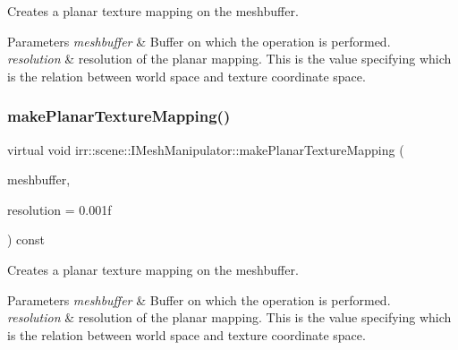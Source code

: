Creates a planar texture mapping on the meshbuffer. 


\begin{DoxyParams}{Parameters}
{\em meshbuffer} & Buffer on which the operation is performed. \\
\hline
{\em resolution} & resolution of the planar mapping. This is the value specifying which is the relation between world space and texture coordinate space. \\
\hline
\end{DoxyParams}
\mbox{\label{classirr_1_1scene_1_1IMeshManipulator_a757511833420a24ed8cbf4dfd6607143}} 
\subsubsection{\texorpdfstring{make\+Planar\+Texture\+Mapping()}{makePlanarTextureMapping()}\hspace{0.1cm}{\footnotesize\ttfamily [4/8]}}
{\footnotesize\ttfamily virtual void irr\+::scene\+::\+I\+Mesh\+Manipulator\+::make\+Planar\+Texture\+Mapping (\begin{DoxyParamCaption}\item[{\hyperlink{classirr_1_1scene_1_1IMeshBuffer}{scene\+::\+I\+Mesh\+Buffer} $\ast$}]{meshbuffer,  }\item[{\hyperlink{namespaceirr_a0277be98d67dc26ff93b1a6a1d086b07}{f32}}]{resolution = {\ttfamily 0.001f} }\end{DoxyParamCaption}) const\hspace{0.3cm}{\ttfamily [pure virtual]}}



Creates a planar texture mapping on the meshbuffer. 


\begin{DoxyParams}{Parameters}
{\em meshbuffer} & Buffer on which the operation is performed. \\
\hline
{\em resolution} & resolution of the planar mapping. This is the value specifying which is the relation between world space and texture coordinate space. \\
\hline
\end{DoxyParams}
\mbox{\label{classirr_1_1scene_1_1IMeshManipulator_abc1b4ae56f126e8466ba6f6634a0f723}} 
